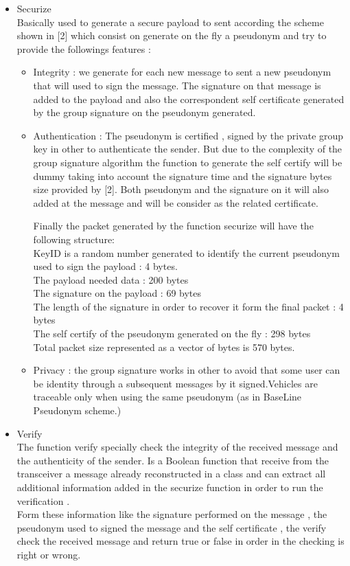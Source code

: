 \begin{itemize}

\item Securize\\
Basically used to generate a secure payload to sent according the scheme shown in [2] which consist on generate on the fly a pseudonym and try to provide the followings features :
\begin{itemize}
\item Integrity : we generate for each new message  to sent a new pseudonym that will used to sign the message. The signature on that message is added to the payload and also the correspondent self certificate generated by the group signature on the pseudonym generated. 
\item Authentication : The pseudonym  is  certified , signed by the private group key in other to authenticate the sender. But due to the complexity of the group signature algorithm the function to generate the self certify will be dummy taking into account the signature time and the signature bytes size provided by [2]. Both pseudonym  and the signature on it will also added at the message and will be consider as the related certificate.

Finally the packet generated by the function securize will have the following structure:\\
    KeyID is a random number generated to identify the current pseudonym used to sign the payload : 4 bytes.\\
    The payload needed data : 200 bytes \\
    The signature on the payload : 69 bytes\\
    The length of the signature in order to recover it form the final packet : 4 bytes\\
    The self certify of the pseudonym generated on the fly : 298 bytes\\
  Total packet size represented as a vector of bytes is 570 bytes.\\
\item Privacy : the group signature works in other to avoid that some user can be identity through a subsequent messages by it signed.Vehicles are traceable only when using the same pseudonym (as in BaseLine Pseudonym scheme.) 
\end{itemize}

\item Verify\\
The function verify specially check the integrity of the received message and the authenticity of the sender.
Is a Boolean function that receive from the transceiver a message already reconstructed in a class and can extract all additional  information added in the securize  function in order to run the verification .\\
Form these information like the signature performed on the message , the pseudonym  used to signed the message and the self certificate , the verify check  the received message and return true or false in order in the checking is right or wrong.


\end{itemize}
